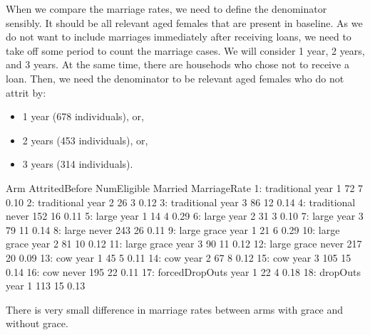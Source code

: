 When we compare the marriage rates, we need to define the denominator sensibly. It should be all relevant aged females that are present in baseline. As we do not want to include marriages immediately after receiving loans, we need to take off some period to count the marriage cases. We will consider 1 year, 2 years, and 3 years. At the same time, there are househods who chose not to receive a loan. 
Then, we need the denominator to be relevant aged females who do not attrit by:
\begin{itemize}
\vspace{1.0ex}\setlength{\itemsep}{1.0ex}\setlength{\baselineskip}{12pt}
\item	1 year (678 individuals), or,
\item	2 years (453 individuals), or,
\item	3 years (314 individuals).
\end{itemize}
\begin{Schunk}
\begin{Soutput}
               Arm AttritedBefore NumEligible Married MarriageRate
 1:    traditional         year 1          72       7         0.10
 2:    traditional         year 2          26       3         0.12
 3:    traditional         year 3          86      12         0.14
 4:    traditional          never         152      16         0.11
 5:          large         year 1          14       4         0.29
 6:          large         year 2          31       3         0.10
 7:          large         year 3          79      11         0.14
 8:          large          never         243      26         0.11
 9:    large grace         year 1          21       6         0.29
10:    large grace         year 2          81      10         0.12
11:    large grace         year 3          90      11         0.12
12:    large grace          never         217      20         0.09
13:            cow         year 1          45       5         0.11
14:            cow         year 2          67       8         0.12
15:            cow         year 3         105      15         0.14
16:            cow          never         195      22         0.11
17: forcedDropOuts         year 1          22       4         0.18
18:       dropOuts         year 1         113      15         0.13
\end{Soutput}
\end{Schunk}
\begin{palepinkleftbar}
\begin{finding}
There is very small difference in marriage rates between arms with grace and without grace.
\end{finding}
\end{palepinkleftbar}


